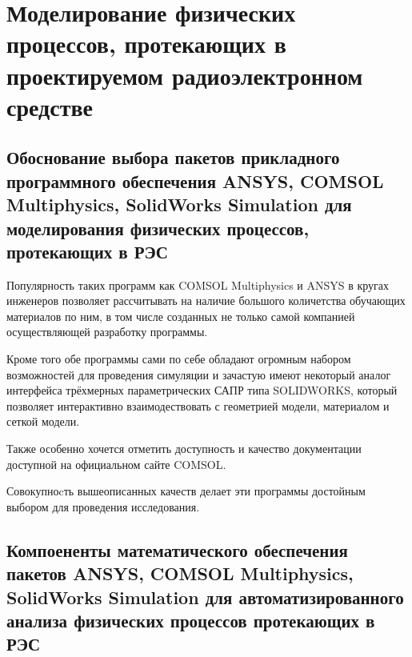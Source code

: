 \section{Моделирование 
  физических процессов,
  протекающих в проектируемом
  радиоэлектронном средстве}

  
  


\subsection{Обоснование выбора пакетов 
  прикладного программного обеспечения 
  ANSYS, COMSOL Multiphysics, SolidWorks Simulation
 для моделирования физических процессов, протекающих в РЭС}

Популярность таких программ как COMSOL Multiphysics и
ANSYS в кругах инженеров позволяет рассчитывать на наличие
большого количетства обучающих материалов по ним, в том числе
созданных не только самой компанией осуществляющей разработку
программы.

Кроме того обе программы сами по себе обладают огромным набором
возможностей для проведения симуляции и зачастую имеют некоторый
аналог интерфейса трёхмерных параметрических САПР типа
SOLIDWORKS, который позволяет интерактивно взаимодествовать с
геометрией модели, материалом и сеткой модели.

Также особенно хочется отметить доступность и качество документации
доступной на официальном сайте COMSOL.

Совокупноcть вышеописанных качеств делает эти программы достойным
выбором для проведения исследования.

\subsection{Компоененты математического обеспечения пакетов
  ANSYS, COMSOL Multiphysics, SolidWorks Simulation
  для автоматизированного анализа физических процессов протекающих в РЭС}

